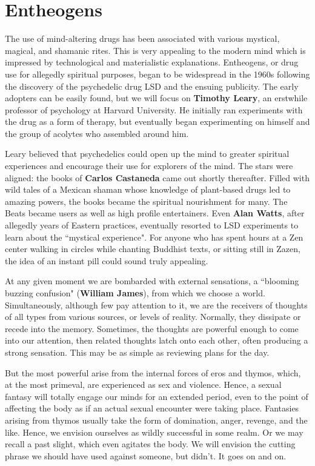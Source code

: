 \section{Entheogens}

The use of mind-altering drugs has been associated with various mystical, magical, and shamanic rites. This is very appealing to the modern mind which is impressed by technological and materialistic explanations. Entheogens, or drug use for allegedly spiritual purposes, began to be widespread in the 1960s following the discovery of the psychedelic drug LSD and the ensuing publicity. The early adopters can be easily found, but we will focus on \textbf{Timothy Leary}, an erstwhile professor of psychology at Harvard University. He initially ran experiments with the drug as a form of therapy, but eventually began experimenting on himself and the group of acolytes who assembled around him.

Leary believed that psychedelics could open up the mind to greater spiritual experiences and encourage their use for explorers of the mind. The stars were aligned: the books of \textbf{Carlos Castaneda} came out shortly thereafter. Filled with wild tales of a Mexican shaman whose knowledge of plant-based drugs led to amazing powers, the books became the spiritual nourishment for many. The Beats became users as well as high profile entertainers. Even \textbf{Alan Watts}, after allegedly years of Eastern practices, eventually resorted to LSD experiments to learn about the ``mystical experience". For anyone who has spent hours at a Zen center walking in circles while chanting Buddhist texts, or sitting still in Zazen, the idea of an instant pill could sound truly appealing.

At any given moment we are bombarded with external sensations, a ``blooming buzzing confusion" (\textbf{William James}), from which we choose a world. Simultaneously, although few pay attention to it, we are the receivers of thoughts of all types from various sources, or levels of reality. Normally, they dissipate or recede into the memory. Sometimes, the thoughts are powerful enough to come into our attention, then related thoughts latch onto each other, often producing a strong sensation. This may be as simple as reviewing plans for the day.

But the most powerful arise from the internal forces of eros and thymos, which, at the most primeval, are experienced as sex and violence. Hence, a sexual fantasy will totally engage our minds for an extended period, even to the point of affecting the body as if an actual sexual encounter were taking place. Fantasies arising from thymos usually take the form of domination, anger, revenge, and the like. Hence, we envision ourselves as wildly successful in some realm. Or we may recall a past slight, which even agitates the body. We will envision the cutting phrase we should have used against someone, but didn't. It goes on and on.

